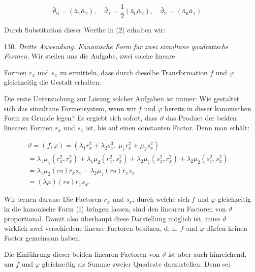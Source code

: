 \[
\bar\vartheta_0 = (\bar a_1\bar\alpha_2), \quad \bar\vartheta_1 = \frac{1}{2}(\bar a_0\bar\alpha_2), \quad \bar\vartheta_2=(\bar a_0\bar\alpha_1).
\]

Durch Substitution dieser Werthe in (2) erhalten wir:


130. \textit{Dritte Anwendung. Kanonische Form für zwei simultane
quadratische Formen.} Wir stellen uns die Aufgabe, zwei solche lineare


Formen $r_x$ und $s_x$ zu ermitteln, dass durch dieselbe Transformation $f$ und
$\varphi$ gleichzeitig die Gestalt erhalten:


Die erste Untersuchung zur Lösung solcher Aufgaben ist immer: Wie gestaltet sich
das simultane Formensystem, wenn wir $f$ und $\varphi$ bereits in dieser kanonischen
Form zu Grunde legen? Es ergiebt sich sofort, dass $\vartheta$ das Product der beiden
linearen Formen $r_x$ und $s_x$ ist, bis auf einen constanten Factor. Denn man erhält:

\[
\begin{gathered}
\vartheta = (f,\varphi) = (\lambda_1 r_x^2 + \lambda_2 s_x^3,\ \mu_1 r_x^2 + \mu_2 s_x^2) %
\\
= \lambda_1\mu_1(r_x^2,r_x^2) + \lambda_1\mu_2(r_x^2,s_x^2) + \lambda_2\mu_1(s_x^2,r_x^2) + \lambda_2\mu_2(s_x^2,s_x^2)
\\
= \lambda_1\mu_2(rs)r_xs_x - \lambda_2\mu_1(rs)r_xs_x
\\
= (\lambda\mu)(rs)r_xs_x.
\end{gathered}
\]

Wir lernen daraus: Die Factoren $r_x$ und $s_x$, durch welche sich $f$ und $\varphi$
gleichzeitig in die kanonische Form (I) bringen lassen, sind den linearen Factoren
von $\vartheta$ proportional. Damit also überhaupt diese Darstellung möglich ist,
muss $\vartheta$ wirklich zwei verschiedene lineare Factoren besitzen, d. h. $f$ und
$\varphi$ dürfen keinen Factor gemeinsam haben.

Die Einführung dieser beiden linearen Factoren von $\vartheta$ ist aber auch
hinreichend, um $f$ und $\varphi$ gleichzeitig als Summe zweier Quadrate darzustellen.
Denn sei

